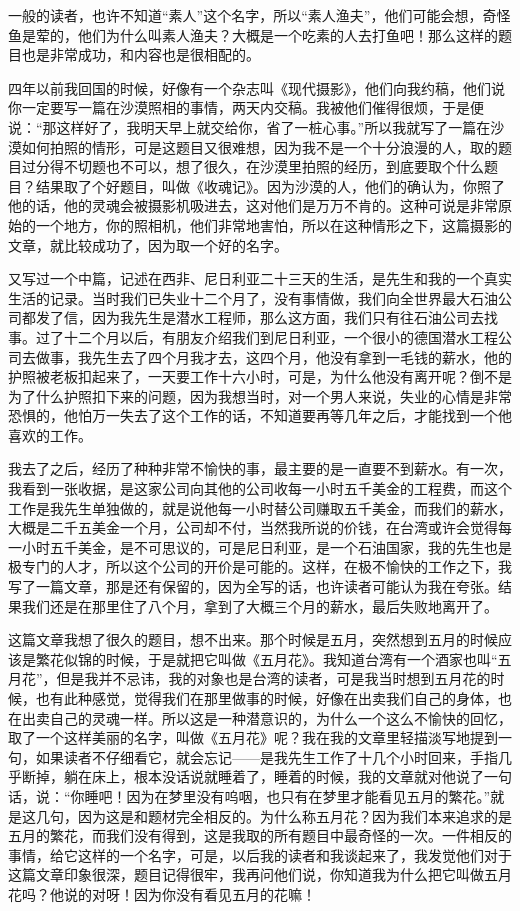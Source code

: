 \par 一般的读者，也许不知道“素人”这个名字，所以“素人渔夫”，他们可能会想，奇怪鱼是荤的，他们为什么叫素人渔夫？大概是一个吃素的人去打鱼吧！那么这样的题目也是非常成功，和内容也是很相配的。
\par 四年以前我回国的时候，好像有一个杂志叫《现代摄影》，他们向我约稿，他们说你一定要写一篇在沙漠照相的事情，两天内交稿。我被他们催得很烦，于是便说：“那这样好了，我明天早上就交给你，省了一桩心事。”所以我就写了一篇在沙漠如何拍照的情形，可是这题目又很难想，因为我不是一个十分浪漫的人，取的题目过分得不切题也不可以，想了很久，在沙漠里拍照的经历，到底要取个什么题目？结果取了个好题目，叫做《收魂记》。因为沙漠的人，他们的确认为，你照了他的话，他的灵魂会被摄影机吸进去，这对他们是万万不肯的。这种可说是非常原始的一个地方，你的照相机，他们非常地害怕，所以在这种情形之下，这篇摄影的文章，就比较成功了，因为取一个好的名字。
\par 又写过一个中篇，记述在西非、尼日利亚二十三天的生活，是先生和我的一个真实生活的记录。当时我们已失业十二个月了，没有事情做，我们向全世界最大石油公司都发了信，因为我先生是潜水工程师，那么这方面，我们只有往石油公司去找事。过了十二个月以后，有朋友介绍我们到尼日利亚，一个很小的德国潜水工程公司去做事，我先生去了四个月我才去，这四个月，他没有拿到一毛钱的薪水，他的护照被老板扣起来了，一天要工作十六小时，可是，为什么他没有离开呢？倒不是为了什么护照扣下来的问题，因为我想当时，对一个男人来说，失业的心情是非常恐惧的，他怕万一失去了这个工作的话，不知道要再等几年之后，才能找到一个他喜欢的工作。
\par 我去了之后，经历了种种非常不愉快的事，最主要的是一直要不到薪水。有一次，我看到一张收据，是这家公司向其他的公司收每一小时五千美金的工程费，而这个工作是我先生单独做的，就是说他每一小时替公司赚取五千美金，而我们的薪水，大概是二千五美金一个月，公司却不付，当然我所说的价钱，在台湾或许会觉得每一小时五千美金，是不可思议的，可是尼日利亚，是一个石油国家，我的先生也是极专门的人才，所以这个公司的开价是可能的。这样，在极不愉快的工作之下，我写了一篇文章，那是还有保留的，因为全写的话，也许读者可能认为我在夸张。结果我们还是在那里住了八个月，拿到了大概三个月的薪水，最后失败地离开了。
\par 这篇文章我想了很久的题目，想不出来。那个时候是五月，突然想到五月的时候应该是繁花似锦的时候，于是就把它叫做《五月花》。我知道台湾有一个酒家也叫“五月花”，但是我并不忌讳，我的对象也是台湾的读者，可是我当时想到五月花的时候，也有此种感觉，觉得我们在那里做事的时候，好像在出卖我们自己的身体，也在出卖自己的灵魂一样。所以这是一种潜意识的，为什么一个这么不愉快的回忆，取了一个这样美丽的名字，叫做《五月花》呢？我在我的文章里轻描淡写地提到一句，如果读者不仔细看它，就会忘记——是我先生工作了十几个小时回来，手指几乎断掉，躺在床上，根本没话说就睡着了，睡着的时候，我的文章就对他说了一句话，说：“你睡吧！因为在梦里没有呜咽，也只有在梦里才能看见五月的繁花。”就是这几句，因为这是和题材完全相反的。为什么称五月花？因为我们本来追求的是五月的繁花，而我们没有得到，这是我取的所有题目中最奇怪的一次。一件相反的事情，给它这样的一个名字，可是，以后我的读者和我谈起来了，我发觉他们对于这篇文章印象很深，题目记得很牢，我再问他们说，你知道我为什么把它叫做五月花吗？他说的对呀！因为你没有看见五月的花嘛！
